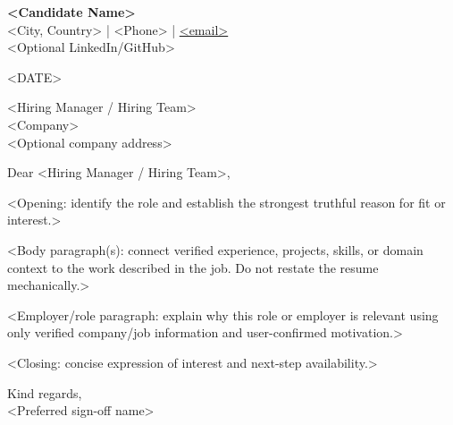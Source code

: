 \documentclass[11pt,a4paper]{article}
\begin{document}

{\Large \textbf{<Candidate Name>}}\\
<City, Country> \;|\; <Phone> \;|\; \href{mailto:<email>}{<email>}\\
<Optional LinkedIn/GitHub>

\vspace{1em}

<DATE>

\vspace{1em}

<Hiring Manager / Hiring Team>\\
<Company>\\
<Optional company address>

\vspace{1em}

Dear <Hiring Manager / Hiring Team>,

<Opening: identify the role and establish the strongest truthful reason for fit or interest.>

<Body paragraph(s): connect verified experience, projects, skills, or domain context to the work described in the job. Do not restate the resume mechanically.>

<Employer/role paragraph: explain why this role or employer is relevant using only verified company/job information and user-confirmed motivation.>

<Closing: concise expression of interest and next-step availability.>

Kind regards,\\
<Preferred sign-off name>
\end{document}
